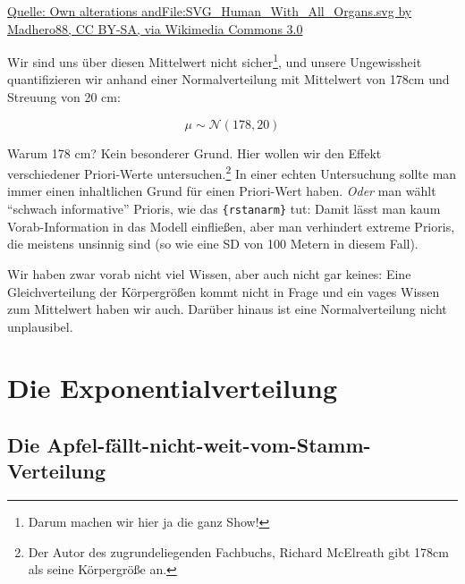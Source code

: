 \documentclass[
  a4paper,
  DIV=11]{scrreprt}
\theoremstyle{definition}
\theoremstyle{remark}
\begin{document}
\href{https://creativecommons.org/licenses/by-sa/3.0}{Quelle: Own
alterations andFile:SVG\_Human\_With\_All\_Organs.svg by Madhero88, CC
BY-SA, via Wikimedia Commons 3.0}

Wir sind uns über diesen Mittelwert nicht sicher\footnote{Darum machen
  wir hier ja die ganz Show!}, und unsere Ungewissheit quantifizieren
wir anhand einer Normalverteilung mit Mittelwert von 178cm und Streuung
von 20 cm:

\[\mu \sim \mathcal{N}(178, 20)\]

Warum 178 cm? Kein besonderer Grund. Hier wollen wir den Effekt
verschiedener Priori-Werte untersuchen.\footnote{Der Autor des
  zugrundeliegenden Fachbuchs, Richard McElreath gibt 178cm als seine
  Körpergröße an.} In einer echten Untersuchung sollte man immer einen
inhaltlichen Grund für einen Priori-Wert haben. \emph{Oder} man wählt
``schwach informative'' Prioris, wie das \texttt{\{rstanarm\}} tut:
Damit lässt man kaum Vorab-Information in das Modell einfließen, aber
man verhindert extreme Prioris, die meistens unsinnig sind (so wie eine
SD von 100 Metern in diesem Fall).

\begin{tcolorbox}[enhanced jigsaw, leftrule=.75mm, left=2mm, bottomrule=.15mm, opacityback=0, coltitle=black, colbacktitle=quarto-callout-note-color!10!white, opacitybacktitle=0.6, rightrule=.15mm, toptitle=1mm, colback=white, colframe=quarto-callout-note-color-frame, arc=.35mm, toprule=.15mm, breakable, titlerule=0mm, bottomtitle=1mm, title=\textcolor{quarto-callout-note-color}{\faInfo}\hspace{0.5em}{Hinweis}]
Wir haben zwar vorab nicht viel Wissen, aber auch nicht gar keines: Eine
Gleichverteilung der Körpergrößen kommt nicht in Frage und ein vages
Wissen zum Mittelwert haben wir auch. Darüber hinaus ist eine
Normalverteilung nicht unplausibel.
\end{tcolorbox}

\hypertarget{die-exponentialverteilung}{%
\section{Die Exponentialverteilung}\label{die-exponentialverteilung}}

\hypertarget{die-apfel-fuxe4llt-nicht-weit-vom-stamm-verteilung}{%
\subsection{Die
Apfel-fällt-nicht-weit-vom-Stamm-Verteilung}\label{die-apfel-fuxe4llt-nicht-weit-vom-stamm-verteilung}}
\end{document}
